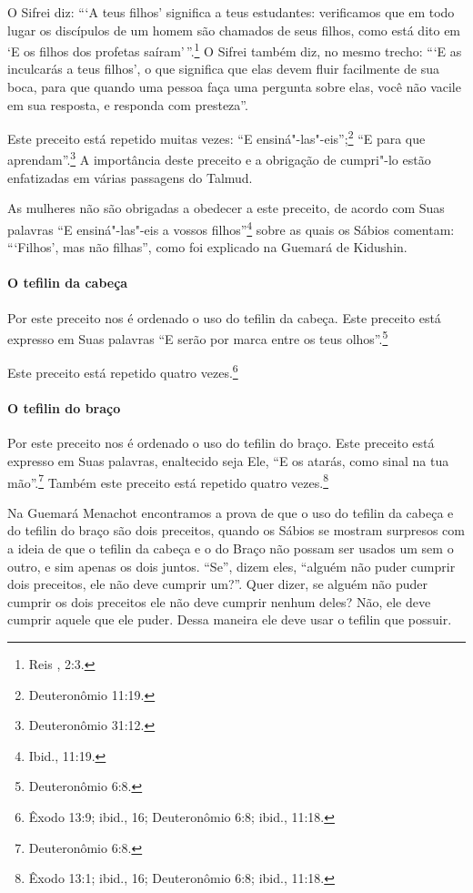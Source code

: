 \begin{multicols}{2}
O Sifrei\starr{} diz: ```A teus filhos' significa a teus estudantes: verificamos
que em todo lugar os discípulos de um homem são chamados de seus filhos,
como está dito em `E os filhos dos profetas saíram'\,''.\footnote{Reis , 2:3.} O Sifrei\starr{} também diz,
no mesmo trecho: ```E as inculcarás a teus filhos', o que significa que
elas devem fluir facilmente de sua boca, para que quando uma pessoa faça uma
pergunta sobre elas, você não vacile em sua resposta, e responda com
presteza''.

Este preceito está repetido muitas vezes: ``E ensiná"-las"-eis'';\footnote{Deuteronômio 11:19.} ``E para que aprendam''.\footnote{Deuteronômio 31:12.} A
importância deste preceito e a obrigação de cumpri"-lo estão enfatizadas
em várias passagens do Talmud\starr.

As mulheres não são obrigadas a obedecer a este preceito, de acordo com
Suas palavras ``E ensiná"-las"-eis a vossos filhos''\footnote{Ibid., 11:19.} sobre
as quais os Sábios comentam: ```Filhos', mas não filhas'', como foi
explicado na Guemará\starr{} de Kidushin\starr.

\paragraph{O tefilin\starr{} da cabeça}

Por este preceito nos é ordenado o uso do tefilin\starr{} da cabeça. Este
preceito está expresso em Suas palavras ``E serão por marca entre os
teus olhos''.\footnote{Deuteronômio 6:8.}

Este preceito está repetido quatro vezes.\footnote{Êxodo 13:9; ibid., 16;
Deuteronômio 6:8; ibid., 11:18.}

\paragraph{O tefilin\starr{} do braço}

Por este preceito nos é ordenado o uso do tefilin\starr{} do braço. Este
preceito está expresso em Suas palavras, enaltecido seja Ele, ``E os
atarás, como sinal na tua mão''.\footnote{Deuteronômio 6:8.} Também este preceito
está repetido quatro vezes.\footnote{Êxodo 13:1; ibid., 16; Deuteronômio 6:8;
ibid., 11:18.}

Na Guemará\starr{} Menachot\starr{} encontramos a prova de que o uso do tefilin\starr{} da cabeça e do tefilin\starr{} do braço são dois preceitos, quando os Sábios se
mostram surpresos com a ideia de que o tefilin\starr{} da cabeça e o do
Braço não possam ser usados um sem o outro, e sim apenas os dois juntos.
``Se'', dizem eles, ``alguém não puder cumprir dois preceitos, ele não
deve cumprir um?''. Quer dizer, se alguém não puder cumprir os dois
preceitos ele não deve cumprir nenhum deles? Não, ele deve cumprir
aquele que ele puder. Dessa maneira ele deve usar o tefilin\starr{} que
possuir.


\end{multicols}
